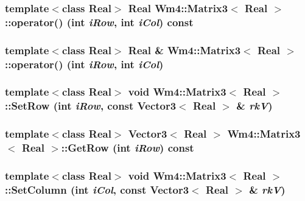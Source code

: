 \subsubsection{\setlength{\rightskip}{0pt plus 5cm}template$<$class Real$>$ Real {\bf Wm4::Matrix3}$<$ Real $>$::operator() (int {\em i\-Row}, int {\em i\-Col}) const\hspace{0.3cm}{\tt  [inline]}}\label{classWm4_1_1Matrix3_65ab739d36757fe4ac6109ddc715f9a7}


\subsubsection{\setlength{\rightskip}{0pt plus 5cm}template$<$class Real$>$ Real \& {\bf Wm4::Matrix3}$<$ Real $>$::operator() (int {\em i\-Row}, int {\em i\-Col})\hspace{0.3cm}{\tt  [inline]}}\label{classWm4_1_1Matrix3_d64da7985e824ad3a05f96e9a0dec07e}


\subsubsection{\setlength{\rightskip}{0pt plus 5cm}template$<$class Real$>$ void {\bf Wm4::Matrix3}$<$ Real $>$::Set\-Row (int {\em i\-Row}, const {\bf Vector3}$<$ Real $>$ \& {\em rk\-V})}\label{classWm4_1_1Matrix3_1dd38e246aa4f04318d21a0ea32aa23d}


\subsubsection{\setlength{\rightskip}{0pt plus 5cm}template$<$class Real$>$ {\bf Vector3}$<$ Real $>$ {\bf Wm4::Matrix3}$<$ Real $>$::Get\-Row (int {\em i\-Row}) const}\label{classWm4_1_1Matrix3_536f131c9d644d09b2b3bb0e0c518049}


\subsubsection{\setlength{\rightskip}{0pt plus 5cm}template$<$class Real$>$ void {\bf Wm4::Matrix3}$<$ Real $>$::Set\-Column (int {\em i\-Col}, const {\bf Vector3}$<$ Real $>$ \& {\em rk\-V})}\label{classWm4_1_1Matrix3_aa851323439ca2dbce87dbfa9a774048}


